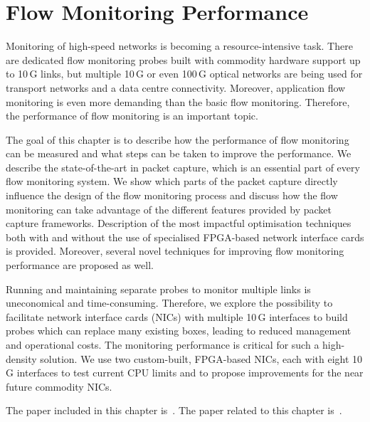 \chapter{Flow Monitoring Performance}\label{chap:flow-monitoring-performance}

\begin{chapintro}

Monitoring of high-speed networks is becoming a resource-intensive task. There are dedicated flow monitoring probes built with commodity hardware support up to 10\,G links, but multiple 10\,G or even 100\,G optical networks are being used for transport networks and a data centre connectivity. Moreover, application flow monitoring is even more demanding than the basic flow monitoring. Therefore, the performance of flow monitoring is an important topic.

The goal of this chapter is to describe how the performance of flow monitoring can be measured and what steps can be taken to improve the performance. We describe the state-of-the-art in packet capture, which is an essential part of every flow monitoring system. We show which parts of the packet capture directly influence the design of the flow monitoring process and discuss how the flow monitoring can take advantage of the different features provided by packet capture frameworks. Description of the most impactful optimisation techniques both with and without the use of specialised FPGA-based network interface cards is provided. Moreover, several novel techniques for improving flow monitoring performance are proposed as well.

Running and maintaining separate probes to monitor multiple links is uneconomical and time-consuming. Therefore, we explore the possibility to facilitate network interface cards (NICs) with multiple 10\,G interfaces to build probes which can replace many existing boxes, leading to reduced management and operational costs. The monitoring performance is critical for such a high-density solution. We use two custom-built, FPGA-based NICs, each with eight 10\,G interfaces to test current CPU limits and to propose improvements for the near future commodity NICs.

The paper included in this chapter is~\cite{Velan-2015-High}. %
The paper related to this chapter is~\cite{Pus-2015-Hardware}.


\end{chapintro}
